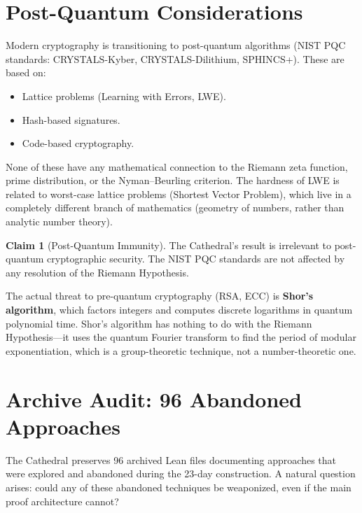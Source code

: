\documentclass[11pt,a4paper]{article}
\theoremstyle{definition}
\newtheorem{claim}[theorem]{Claim}
\theoremstyle{plain}
\begin{document}
\section{Post-Quantum Considerations}
\label{sec:postquantum}

Modern cryptography is transitioning to post-quantum algorithms
(NIST PQC standards: CRYSTALS-Kyber, CRYSTALS-Dilithium, SPHINCS+).
These are based on:

\begin{itemize}
  \item Lattice problems (Learning with Errors, LWE).
  \item Hash-based signatures.
  \item Code-based cryptography.
\end{itemize}

None of these have any mathematical connection to the Riemann zeta
function, prime distribution, or the Nyman--Beurling criterion. The
hardness of LWE is related to worst-case lattice problems
(Shortest Vector Problem), which live in a completely different
branch of mathematics (geometry of numbers, rather than analytic
number theory).

\begin{claim}[Post-Quantum Immunity]
The Cathedral's result is irrelevant to post-quantum cryptographic
security. The NIST PQC standards are not affected by any resolution
of the Riemann Hypothesis.
\end{claim}

The actual threat to pre-quantum cryptography (RSA, ECC) is
\textbf{Shor's algorithm}, which factors integers and computes
discrete logarithms in quantum polynomial time. Shor's algorithm
has nothing to do with the Riemann Hypothesis---it uses the quantum
Fourier transform to find the period of modular exponentiation, which
is a group-theoretic technique, not a number-theoretic one.

\section{Archive Audit: 96 Abandoned Approaches}
\label{sec:archive}

The Cathedral preserves 96 archived Lean files documenting approaches
that were explored and abandoned during the 23-day construction. A
natural question arises: could any of these abandoned techniques
be weaponized, even if the main proof architecture cannot?
\end{document}
